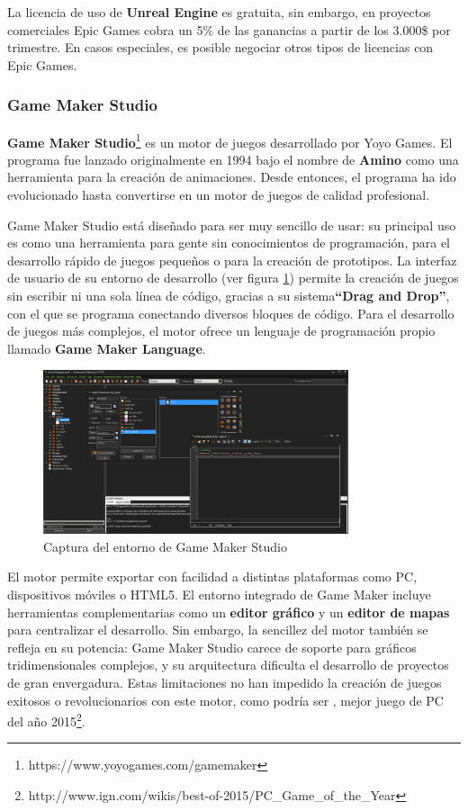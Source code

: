 La licencia de uso de \textbf{Unreal Engine} es gratuita, sin embargo, en proyectos comerciales Epic Games cobra un 5\% de las ganancias a partir de los 3.000\$ por trimestre. En casos especiales, es posible negociar otros tipos de licencias con Epic Games.

\subsubsection{Game Maker Studio}
\textbf{Game Maker Studio}\footnote{https://www.yoyogames.com/gamemaker} es un motor de juegos desarrollado por Yoyo Games. El programa fue lanzado originalmente en 1994 bajo el nombre de \textbf{Amino} como una herramienta para la creación de animaciones. Desde entonces, el programa ha ido evolucionado hasta convertirse en un motor de juegos de calidad profesional.

Game Maker Studio está diseñado para ser muy sencillo de usar: su principal uso es como una herramienta para gente sin conocimientos de programación, para el desarrollo rápido de juegos pequeños o para la creación de prototipos. La interfaz de usuario de su entorno de desarrollo (ver figura \ref{captura-game-maker}) permite la creación de juegos sin escribir ni una sola línea de código, gracias a su sistema\textbf{``Drag and Drop''}, con el que se programa conectando diversos bloques de código. Para el desarrollo de juegos más complejos, el motor ofrece un lenguaje de programación propio llamado \textbf{Game Maker Language}. 

\begin{figure}[h]
	\includegraphics[width=0.8\textwidth]{images/estadodelarte/motores/captura-game-maker}
	\centering
	\caption{Captura del entorno de Game Maker Studio}
	\label{captura-game-maker}
\end{figure}

El motor permite exportar con facilidad a distintas plataformas como PC, dispositivos móviles o HTML5. El entorno integrado de Game Maker incluye herramientas complementarias como un \textbf{editor gráfico} y un \textbf{editor de mapas} para centralizar el desarrollo. Sin embargo, la sencillez del motor también se refleja en su potencia: Game Maker Studio carece de soporte para gráficos tridimensionales complejos, y su arquitectura dificulta el desarrollo de proyectos de gran envergadura. Estas limitaciones no han impedido la creación de juegos exitosos o revolucionarios con este motor, como podría ser , mejor juego de PC del año 2015\footnote{http://www.ign.com/wikis/best-of-2015/PC\_Game\_of\_the\_Year}.

